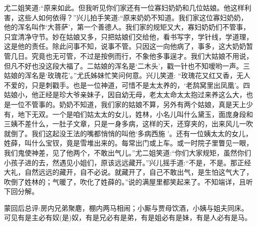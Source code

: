 \begin{parag}
    尤二姐笑道:“原来如此。但我听见你们家还有一位寡妇奶奶和几位姑娘。他这样利害，这些人如何依得？”兴儿拍手笑道:“原来奶奶不知道。我们家这位寡妇奶奶，他的浑名叫作‘大菩萨’，第一个善德人。我们家的规矩又大，寡妇奶奶们不管事，只宜清净守节。妙在姑娘又多，只把姑娘们交给他，看书写字，学针线，学道理，这是他的责任。除此问事不知，说事不管。只因这一向他病了，事多，这大奶奶暂管几日。究竟也无可管，不过是按例而行，不象他多事逞才。我们大姑娘不用说，但凡不好也没这段大福了。二姑娘的浑名是‘二木头’，戳一针也不知嗳哟一声。三姑娘的浑名是‘玫瑰花’。”尤氏姊妹忙笑问何意。兴儿笑道: “玫瑰花又红又香，无人不爱的，只是刺戳手。也是一位神道，可惜不是太太养的，‘老鸹窝里出凤凰’。四姑娘小，他正经是珍大爷亲妹子，因自幼无母，老太太命太太抱过来养这么大，也是一位不管事的。奶奶不知道，我们家的姑娘不算，另外有两个姑娘，真是天上少有，地下无双。一个是咱们姑太太的女儿，姓林，小名儿叫什么黛玉，面庞身段和三姨不差什么，一肚子文章，只是一身多病，这样的天，还穿夹的，出来风儿一吹就倒了。我们这起没王法的嘴都悄悄的叫他‘多病西施 ’。还有一位姨太太的女儿，姓薛，叫什么宝钗，竟是雪堆出来的。每常出门或上车。或一时院子里瞥见一眼，我们鬼使神差，见了他两个，不敢出气儿。”尤二姐笑道:“你们大家规矩，虽然你们小孩子进的去，然遇见小姐们，原该远远藏开。”兴儿摇手道:“不是，不是。那正经大礼，自然远远的藏开，自不必说。就藏开了，自己不敢出气，是生怕这气大了，吹倒了姓林的；气暖了，吹化了姓薛的。”说的满屋里都笑起来了。不知端详，且听下回分解。
\end{parag}


\begin{parag}
    \begin{note}蒙回后总评:房内兄弟聚麀，棚内两马相闹；小厮与贾母饮酒，小姨与姐夫同床。可见有是主必有奴(是)奴，有是兄必有是弟，有是姐必有是妹，有是人必有是马。\end{note}
\end{parag}

